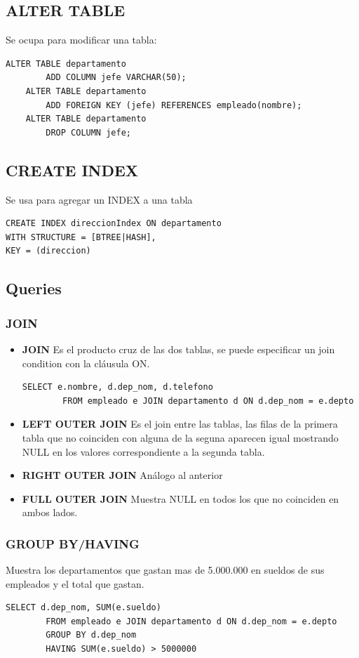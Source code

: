 \documentclass[11pt,letterpaper]{article}
\begin{document}
\subsection{ALTER TABLE}
Se ocupa para modificar una tabla:
\begin{lstlisting}[frame=single]
	ALTER TABLE departamento
		ADD COLUMN jefe VARCHAR(50);
	ALTER TABLE departamento
		ADD FOREIGN KEY (jefe) REFERENCES empleado(nombre);
	ALTER TABLE departamento
		DROP COLUMN jefe;
\end{lstlisting}

\subsection{CREATE INDEX}
Se usa para agregar un INDEX a una tabla
\begin{lstlisting}[frame=single]
CREATE INDEX direccionIndex ON departamento
WITH STRUCTURE = [BTREE|HASH],
KEY = (direccion) 
\end{lstlisting}
\subsection{Queries}
\subsubsection{JOIN}
\begin{itemize}
	\item \textbf{JOIN} Es el producto cruz de las dos tablas, se puede especificar un join condition con la cláusula ON.
	\begin{lstlisting}[frame=single]
		SELECT e.nombre, d.dep_nom, d.telefono
		FROM empleado e JOIN departamento d ON d.dep_nom = e.depto 
	\end{lstlisting}
	\item \textbf{LEFT OUTER JOIN} Es el join entre las tablas, las filas de la primera tabla que no coinciden con alguna de la seguna aparecen igual mostrando NULL en los valores correspondiente a la segunda tabla.
	\item \textbf{RIGHT OUTER JOIN} Análogo al anterior
	\item \textbf{FULL OUTER JOIN} Muestra NULL en todos los que no coinciden en ambos lados.
\end{itemize}
\subsubsection{GROUP BY/HAVING}
	Muestra los departamentos que gastan mas de 5.000.000 en sueldos de sus empleados y el total que gastan.
	\begin{lstlisting}[frame=single]
		SELECT d.dep_nom, SUM(e.sueldo)
		FROM empleado e JOIN departamento d ON d.dep_nom = e.depto
		GROUP BY d.dep_nom
		HAVING SUM(e.sueldo) > 5000000	
	\end{lstlisting}
\end{document}
